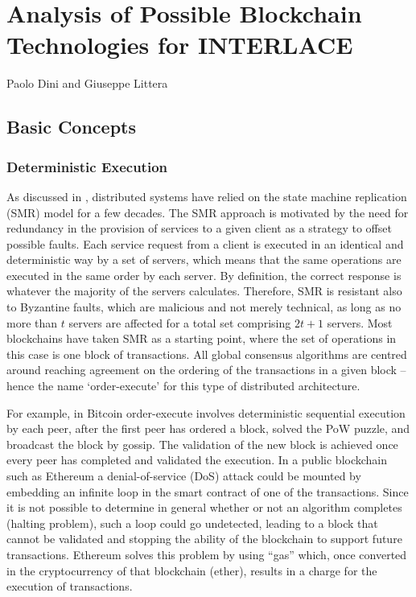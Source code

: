 \chapter{Analysis of Possible Blockchain Technologies for INTERLACE}
\label{ch:dlt}

\vspace{-1cm}
\begin{center}
Paolo Dini and Giuseppe Littera
\end{center}

\section{Basic Concepts}
\subsection{Deterministic Execution}
As discussed in \cite{AndroulakiEtAl2018}, distributed systems have relied on the state machine replication (SMR) model \cite{Schneider1990} for a few decades. The SMR approach is motivated by the need for redundancy in the provision of services to a given client as a strategy to offset possible faults. Each service request from a client is executed in an identical and deterministic way by a set of servers, which means that the same operations are executed in the same order by each server. By definition, the correct response is whatever the majority of the servers calculates. Therefore, SMR is resistant also to Byzantine faults, which are malicious and not merely technical, as long as no more than $t$ servers are affected for a total set comprising $2t + 1$ servers. Most blockchains have taken SMR as a starting point, where the set of operations in this case is one block of transactions. All global consensus algorithms are centred around reaching agreement on the ordering of the transactions in a given block -- hence the name `order-execute' for this type of distributed architecture.

For example, in Bitcoin order-execute involves deterministic sequential execution by each peer, after the first peer has ordered a block, solved the PoW puzzle, and broadcast the block by gossip. The validation of the new block is achieved once every peer has completed and validated the execution. In a public blockchain such as Ethereum a denial-of-service (DoS) attack could be mounted by embedding an infinite loop in the smart contract of one of the transactions. Since it is not possible to determine in general whether or not an algorithm completes (halting problem), such a loop could go undetected, leading to a block that cannot be validated and stopping the ability of the blockchain to support future transactions. Ethereum solves this problem by using ``gas'' which, once converted in the cryptocurrency of that blockchain (ether), results in a charge for the execution of transactions.

